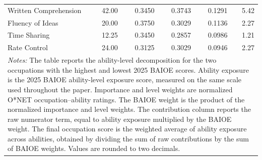 \begin{longtable}{lrrrrr}
Written Comprehension & 42.00 & 0.3450 & 0.3743 & 0.1291 & 5.42 \\
Fluency of Ideas & 20.00 & 0.3750 & 0.3029 & 0.1136 & 2.27 \\
Time Sharing & 12.25 & 0.3450 & 0.2857 & 0.0986 & 1.21 \\
Rate Control & 24.00 & 0.3125 & 0.3029 & 0.0946 & 2.27 \\
\multicolumn{6}{p{0.95\linewidth}}{\footnotesize \textit{Notes:} The table reports the ability-level decomposition for the two occupations with the highest and lowest 2025 BAIOE scores. Ability exposure is the 2025 BAIOE ability-level exposure score, measured on the same scale used throughout the paper. Importance and level weights are normalized O*NET occupation--ability ratings. The BAIOE weight is the product of the normalized importance and level weights. The contribution column reports the raw numerator term, equal to ability exposure multiplied by the BAIOE weight. The final occupation score is the weighted average of ability exposure across abilities, obtained by dividing the sum of raw contributions by the sum of BAIOE weights. Values are rounded to two decimals.} \\
\end{longtable}
